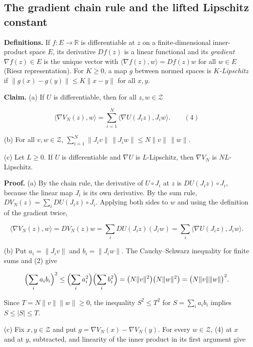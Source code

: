 \documentclass[11pt,a4paper]{report}
\begin{document}
\subsection{\texorpdfstring{The gradient chain rule and the lifted Lipschitz constant}{The gradient chain rule and the lifted Lipschitz constant}}
\label{report-step-IPLA-Geometry-lean-4}


\textbf{Definitions.} If \(f:E\to\mathbb R\) is differentiable at \(z\) on a finite-dimensional inner-product space \(E\), its derivative \(Df(z)\) is a linear functional and its \emph{gradient} \(\nabla f(z)\in E\) is the unique vector with \(\langle\nabla f(z),w\rangle=Df(z)w\) for all \(w\in E\) (Riesz representation). For \(K\ge0\), a map \(g\) between normed spaces is \emph{\(K\)-Lipschitz} if \(\|g(x)-g(y)\|\le K\|x-y\|\) for all \(x,y\).




\textbf{Claim.} (a) If \(U\) is differentiable, then for all \(z,w\in\mathcal Z\)


\[\langle\nabla V_N(z),w\rangle=\sum_{i=1}^N\langle\nabla U(J_iz),J_iw\rangle .\qquad(4)\]


(b) For all \(v,w\in\mathcal Z\), \(\sum_{i=1}^N\|J_iv\|\,\|J_iw\|\le N\|v\|\,\|w\|\).




(c) Let \(L\ge0\). If \(U\) is differentiable and \(\nabla U\) is \(L\)-Lipschitz, then \(\nabla V_N\) is \(NL\)-Lipschitz.




\textbf{Proof.} (a) By the chain rule, the derivative of \(U\circ J_i\) at \(z\) is \(DU(J_iz)\circ J_i\), because the linear map \(J_i\) is its own derivative. By the sum rule, \(DV_N(z)=\sum_iDU(J_iz)\circ J_i\). Applying both sides to \(w\) and using the definition of the gradient twice,


\[\langle\nabla V_N(z),w\rangle=DV_N(z)w=\sum_iDU(J_iz)(J_iw)=\sum_i\langle\nabla U(J_iz),J_iw\rangle .\]


(b) Put \(a_i=\|J_iv\|\) and \(b_i=\|J_iw\|\). The Cauchy–Schwarz inequality for finite sums and (2) give


\[\Bigl(\sum_ia_ib_i\Bigr)^2\le\Bigl(\sum_ia_i^2\Bigr)\Bigl(\sum_ib_i^2\Bigr)=\bigl(N\|v\|^2\bigr)\bigl(N\|w\|^2\bigr)=\bigl(N\|v\|\|w\|\bigr)^2 .\]


Since \(T=N\|v\|\|w\|\ge0\), the inequality \(S^2\le T^2\) for \(S=\sum_ia_ib_i\) implies \(S\le|S|\le T\).




(c) Fix \(x,y\in\mathcal Z\) and put \(g=\nabla V_N(x)-\nabla V_N(y)\). For every \(w\in\mathcal Z\), (4) at \(x\) and at \(y\), subtracted, and linearity of the inner product in its first argument give
\end{document}
